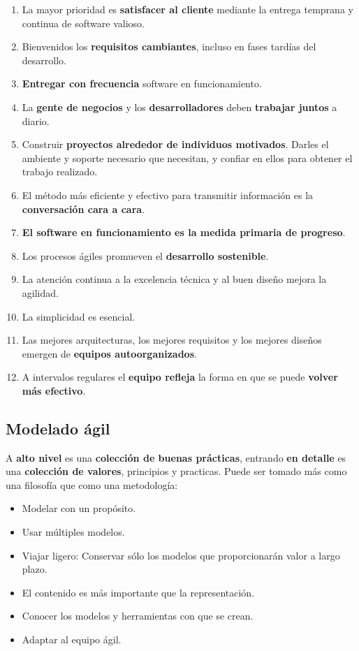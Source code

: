\begin{enumerate}
   \item La mayor prioridad es \textbf{satisfacer al cliente} mediante la entrega temprana y continua de software valioso.
   \item Bienvenidos los \textbf{requisitos cambiantes}, incluso en fases tardías del desarrollo.
   \item \textbf{Entregar con frecuencia} software en funcionamiento.
   \item La \textbf{gente de negocios} y los \textbf{desarrolladores} deben \textbf{trabajar juntos} a diario. %
   \item Construir \textbf{proyectos alrededor de individuos motivados}. Darles el ambiente y soporte necesario que necesitan, y confiar en ellos para obtener el trabajo realizado. %
   \item El método más eficiente y efectivo para transmitir información es la \textbf{conversación cara a cara}.
   \item \textbf{El software en funcionamiento es la medida primaria de progreso}.
   \item Los procesos ágiles promueven el \textbf{desarrollo sostenible}. %
   \item La atención continua a la excelencia técnica y al buen diseño mejora la agilidad.
   \item La simplicidad es esencial. %
   \item Las mejores arquitecturas, los mejores requisitos y los mejores diseños emergen de \textbf{equipos autoorganizados}.
   \item A intervalos regulares el \textbf{equipo refleja} la forma en que se puede \textbf{volver más efectivo}.
\end{enumerate}

\subsection{Modelado ágil}
A \textbf{alto nivel} es una \textbf{colección de buenas prácticas}, entrando \textbf{en detalle} es una \textbf{colección de valores}, principios y practicas. Puede ser tomado más como una filosofía que como una metodología:
\begin{itemize}
   \item Modelar con un propósito.
   \item Usar múltiples modelos.
   \item Viajar ligero: Conservar sólo los modelos que proporcionarán valor a largo plazo.
   \item El contenido es más importante que la representación.
   \item Conocer los modelos y herramientas con que se crean.
   \item Adaptar al equipo ágil.
\end{itemize}

